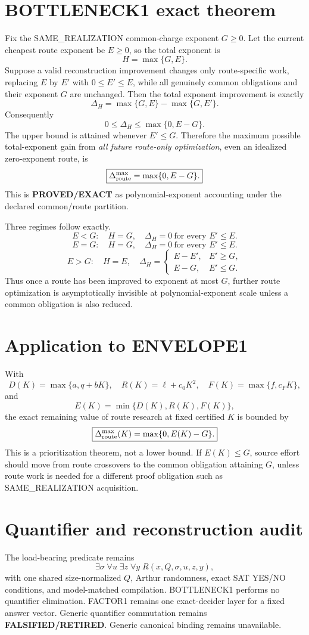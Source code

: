 \documentclass[11pt]{article}
\begin{document}
\section*{BOTTLENECK1 exact theorem}
Fix the SAME\_REALIZATION common-charge exponent \(G\ge0\). Let the current cheapest route exponent be \(E\ge0\), so the total exponent is
\[
H=\max\{G,E\}.
\]
Suppose a valid reconstruction improvement changes only route-specific work, replacing \(E\) by \(E'\) with \(0\le E'\le E\), while all genuinely common obligations and their exponent \(G\) are unchanged. Then the total exponent improvement is exactly
\[
\boxed{\Delta_H=\max\{G,E\}-\max\{G,E'\}.}
\]
Consequently
\[
\boxed{0\le\Delta_H\le \max\{0,E-G\}.}
\]
The upper bound is attained whenever \(E'\le G\). Therefore the maximum possible total-exponent gain from \emph{all future route-only optimization}, even an idealized zero-exponent route, is
\[
\boxed{\Delta_{\rm route}^{\max}=\max\{0,E-G\}.}
\]
This is \textbf{PROVED/EXACT} as polynomial-exponent accounting under the declared common/route partition.

Three regimes follow exactly.
\[
E<G:\quad H=G,\quad \Delta_H=0\ \text{for every }E'\le E.
\]
\[
E=G:\quad H=G,\quad \Delta_H=0\ \text{for every }E'\le E.
\]
\[
E>G:\quad H=E,\quad
\Delta_H=
\begin{cases}
E-E',&E'\ge G,\\
E-G,&E'\le G.
\end{cases}
\]
Thus once a route has been improved to exponent at most \(G\), further route optimization is asymptotically invisible at polynomial-exponent scale unless a common obligation is also reduced.

\section*{Application to ENVELOPE1}
With
\[
D(K)=\max\{a,q+bK\},\quad
R(K)=\ell+c_0K^2,\quad
F(K)=\max\{f,c_FK\},
\]
and
\[
E(K)=\min\{D(K),R(K),F(K)\},
\]
the exact remaining value of route research at fixed certified \(K\) is bounded by
\[
\boxed{\Delta_{\rm route}^{\max}(K)=\max\{0,E(K)-G\}.}
\]
This is a prioritization theorem, not a lower bound. If \(E(K)\le G\), source effort should move from route crossovers to the common obligation attaining \(G\), unless route work is needed for a different proof obligation such as SAME\_REALIZATION acquisition.

\section*{Quantifier and reconstruction audit}
The load-bearing predicate remains
\[
\exists\sigma\;\forall u\;\exists z\;\forall y\;R(x,Q,\sigma,u,z,y),
\]
with one shared size-normalized \(Q\), Arthur randomness, exact SAT YES/NO conditions, and model-matched compilation. BOTTLENECK1 performs no quantifier elimination. FACTOR1 remains one exact-decider layer for a fixed answer vector. Generic quantifier commutation remains \textbf{FALSIFIED/RETIRED}. Generic canonical binding remains unavailable.
\end{document}
